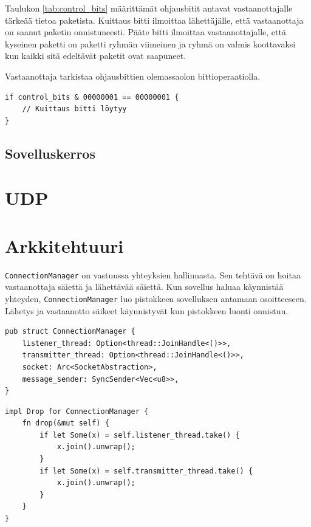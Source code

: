 \documentclass[a4paper,12pt]{article}
\begin{document}
    Taulukon \ref{tab:control_bits} määrittämät ohjausbitit antavat vastaanottajalle tärkeää tietoa paketista. Kuittaus bitti ilmoittaa lähettäjälle, että vastaanottaja on saanut paketin onnistuneesti. Pääte bitti ilmoittaa vastaanottajalle, että kyseinen paketti on paketti ryhmän viimeinen ja ryhmä on valmis koottavaksi kun kaikki sitä edeltävät paketit ovat saapuneet. \par
    Vastaanottaja tarkistaa ohjausbittien olemassaolon bittioperaatiolla.
\begin{lstlisting}[caption={Kuittasbitin tarkistus ohjausbiteistä}, label={lst:ack_check}]
if control_bits & 00000001 == 00000001 {
    // Kuittaus bitti löytyy
}
\end{lstlisting}




    \subsection{Sovelluskerros}\label{subsec:sovelluskerros}
    \blindtext


    \section{UDP}\label{sec:udp}
    \blindtext


    \section{Arkkitehtuuri}\label{sec:arkkitehtuuri} 
    \architecture

     \lstinline{ConnectionManager} on vastuussa yhteyksien hallinnasta. Sen tehtävä on 
    hoitaa vastaanottaja säiettä ja lähettävää säiettä. Kun sovellus haluaa käynnistää yhteyden, 
    \lstinline{ConnectionManager} luo pistokkeen sovelluksen antamaan osoitteeseen. 
    Lähetys ja vastaanotto säikeet käynnistyvät kun pistokkeen luonti onnistuu. 
    \par
    \begin{lstlisting}[caption={ConnectionManager rakenne}, label={lst:connectionmanager}]
pub struct ConnectionManager {
    listener_thread: Option<thread::JoinHandle<()>>,
    transmitter_thread: Option<thread::JoinHandle<()>>,
    socket: Arc<SocketAbstraction>,
    message_sender: SyncSender<Vec<u8>>,
}\end{lstlisting}

\begin{lstlisting}[caption={Drop ominaisuuden toteutus ConnectionManager:ille}, label={lst:connectionmanager_drop}]
impl Drop for ConnectionManager {
    fn drop(&mut self) {
        if let Some(x) = self.listener_thread.take() {
            x.join().unwrap();
        }
        if let Some(x) = self.transmitter_thread.take() {
            x.join().unwrap();
        }
    }
}
\end{lstlisting}
\end{document}
